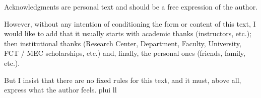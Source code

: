 
%

\begin{ntacknowledgements}

Acknowledgments are personal text and should be a free expression of the author.

However, without any intention of conditioning the form or content of this text, I would like to add that it usually starts with academic thanks (instructors, etc.); then institutional thanks (Research Center, Department, Faculty, University, FCT / MEC scholarships, etc.) and, finally, the personal ones (friends, family, etc.).

But I insist that there are no fixed rules for this text, and it must, above all, express what the author feels.
plui ll
\end{ntacknowledgements}